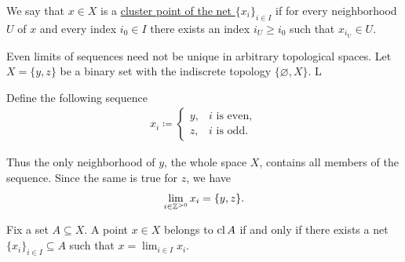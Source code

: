 \begin{definition}\label{def:net_cluster_point}\cite[50]{Engelking1989}
  We say that $x \in X$ is a \ul{cluster point of the net $\{ x_i \}_{i \in I}$} if for every neighborhood $U$ of $x$ and every index $i_0 \in I$ there exists an index $i_U \geq i_0$ such that $x_{i_U} \in U$.
\end{definition}

\begin{example}\label{ex:multiple_limit_points_of_net}
  Even limits of sequences need not be unique in arbitrary topological spaces. Let $X = \{ y, z \}$ be a binary set with the indiscrete topology $\{ \varnothing, X \}$. L

  Define the following sequence
  \begin{align*}
    x_i \coloneqq \begin{cases}
      y, &i \text{ is even}, \\
      z, &i \text{ is odd}.
    \end{cases}
  \end{align*}

  Thus the only neighborhood of $y$, the whole space $X$, contains all members of the sequence. Since the same is true for $z$, we have
  \begin{align*}
    \lim_{i \in \mathbb Z^{>0}} x_i = \{ y, z \}.
  \end{align*}
\end{example}

\begin{proposition}\label{thm:limit_point_iff_in_closure}\cite[proposition 1.6.3]{Engelking1989}
  Fix a set $A \subseteq X$. A point $x \in X$ belongs to $\operatorname{cl}{A}$ if and only if there exists a net $\{ x_i \}_{i \in I} \subseteq A$ such that $x = \lim_{i \in I} x_i$.
\end{proposition}
